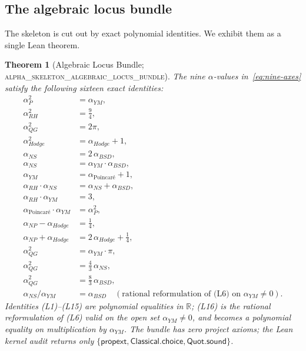 \documentclass[11pt,a4paper]{amsart}
\theoremstyle{plain}
\newtheorem{theorem}{Theorem}[section]
\theoremstyle{definition}
\newcommand{\Rl}{\mathbb{R}}
\newcommand{\aP}{\alpha_{P}}
\newcommand{\aNP}{\alpha_{NP}}
\newcommand{\aRH}{\alpha_{RH}}
\newcommand{\aYM}{\alpha_{YM}}
\newcommand{\aNS}{\alpha_{NS}}
\newcommand{\aBSD}{\alpha_{BSD}}
\newcommand{\aHodge}{\alpha_{Hodge}}
\newcommand{\aPoinc}{\alpha_{\text{Poincar\'e}}}
\newcommand{\aQG}{\alpha_{QG}}
\newcommand{\LeanThm}[1]{\textsc{#1}}
\begin{document}
\subsection{The algebraic locus bundle}
\label{subsec:locus}
The skeleton is cut out by exact polynomial identities. We exhibit them as
a single Lean theorem.
\begin{theorem}[Algebraic Locus Bundle; \LeanThm{alpha\_skeleton\_algebraic\_locus\_bundle}]
\label{thm:locus}
The nine $\alpha$-values in~\eqref{eq:nine-axes} satisfy the following
sixteen exact identities:
\begin{align}
\aP^2 &= \aYM,                                          \tag{L1} \\
\aRH^2 &= \tfrac{9}{4},                                 \tag{L2} \\
\aQG^2 &= 2\pi,                                         \tag{L3} \\
\aHodge^2 &= \aHodge + 1,                               \tag{L4} \\
\aNS &= 2\,\aBSD,                                       \tag{L5} \\
\aNS &= \aYM \cdot \aBSD,                               \tag{L6} \\
\aYM &= \aPoinc + 1,                                    \tag{L7} \\
\aRH \cdot \aNS &= \aNS + \aBSD,                        \tag{L8} \\
\aRH \cdot \aYM &= 3,                                   \tag{L9} \\
\aPoinc \cdot \aYM &= \aP^2,                            \tag{L10} \\
\aNP - \aHodge &= \tfrac{1}{4},                         \tag{L11} \\
\aNP + \aHodge &= 2\,\aHodge + \tfrac{1}{4},            \tag{L12} \\
\aQG^2 &= \aYM \cdot \pi,                               \tag{L13} \\
\aQG^2 &= \tfrac{4}{3}\,\aNS,                           \tag{L14} \\
\aQG^2 &= \tfrac{8}{3}\,\aBSD,                          \tag{L15} \\
\aNS / \aYM &= \aBSD \quad (\text{rational reformulation of (L6) on } \aYM \neq 0). \tag{L16}
\end{align}
Identities (L1)--(L15) are polynomial equalities in $\Rl$; (L16) is the
rational reformulation of (L6) valid on the open set $\aYM \neq 0$, and
becomes a polynomial equality on multiplication by $\aYM$. The bundle has
zero project axioms; the Lean kernel audit returns only $\{\mathsf{propext},
\mathsf{Classical.choice}, \mathsf{Quot.sound}\}$.
\end{theorem}
\end{document}
